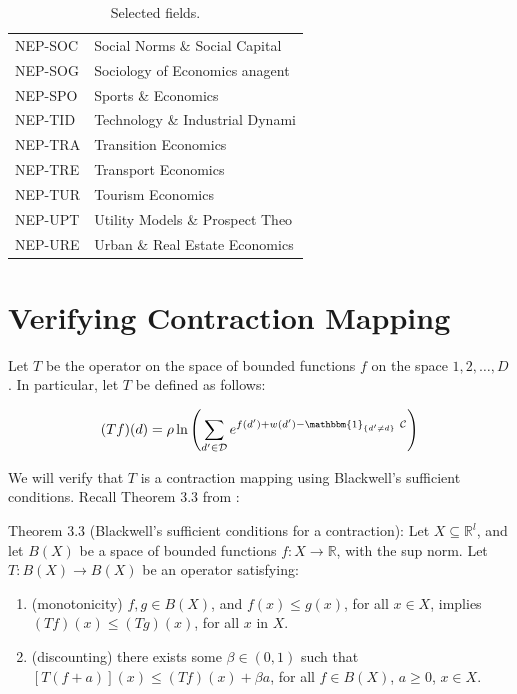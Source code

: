 \begin{table}[!ht]
{\begin{tabular}{ll}
        NEP-SOC   & Social Norms \& Social Capital\\
        NEP-SOG   & Sociology of Economics anagent\\
        NEP-SPO   & Sports \& Economics\\
        NEP-TID   & Technology \& Industrial Dynami\\
        NEP-TRA   & Transition Economics\\
        NEP-TRE   & Transport Economics\\
        NEP-TUR   & Tourism Economics\\
        NEP-UPT   & Utility Models \& Prospect Theo\\
        NEP-URE   & Urban \& Real Estate Economics \\ \hline

    \end{tabular}}
    \caption{Selected fields.}
\end{table}

\clearpage
\section{Verifying Contraction Mapping}
\label{sec:contr_map}

Let $T$ be the operator on the space of bounded functions $f$ on the
space $1,2,\dots,D$. In particular, let $T$ be defined as follows:

\begin{equation}
    (Tf)(d) = \rho \ln\left( \sum_{d' \in \mathcal{D}} e^{f(d') + w(d') - \mathbbm{1}_{\{d'\neq d\}} \ \mathcal{C}} \right)    
    \label{eq:operator}
\end{equation}

We will verify that $T$ is a contraction mapping using Blackwell's
sufficient conditions. Recall Theorem 3.3 from
\citet{stokey1989recursive}:

Theorem 3.3 (Blackwell's sufficient conditions for a contraction): Let
$X \subseteq \mathbb{R}^l$, and let $B(X)$ be a space of bounded
functions $f:X\rightarrow \mathbb{R}$, with the sup norm. Let
$T: B(X) \rightarrow B(X)$ be an operator satisfying:

\begin{enumerate}
\def\labelenumi{\alph{enumi}.}
\itemsep1pt\parskip0pt
\item
  (monotonicity) $f, g \in B(X)$, and $f(x) \leq g(x)$, for all
  $x \in X$, implies $(Tf)(x) \leq (Tg)(x)$, for all $x$ in $X$.
\item
  (discounting) there exists some $\beta \in (0,1)$ such that
  $[T(f + a)](x) \leq (Tf)(x) + \beta a$, for all $f \in B(X) $,
  $a \geq 0$, $x\in X$.
\end{enumerate}

